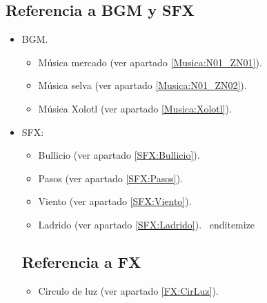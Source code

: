 \subsection{Referencia a BGM y SFX}
\begin{itemize} 
	\item BGM.
	\begin{itemize}
		\item Música  mercado (ver apartado \ref{Musica:N01_ZN01}).
		\item Música  selva (ver apartado \ref{Musica:N01_ZN02}).
		\item Música  Xolotl (ver apartado \ref{Musica:Xolotl}).
	\end{itemize} 
	\item SFX:
	\begin{itemize}
		\item Bullicio (ver apartado \ref{SFX:Bullicio}).
		\item Pasos (ver apartado \ref{SFX:Pasos}).
		\item Viento (ver apartado \ref{SFX:Viento}).
		\item Ladrido (ver apartado \ref{SFX:Ladrido}).
\	end{itemize}
\end{itemize}
\subsection{Referencia a FX}
\begin{itemize}
	\item Circulo de luz (ver apartado \ref{FX:CirLuz}).
\end{itemize}
\end{itemize}